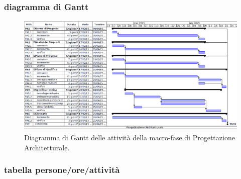 \newpage
\subsubsection{diagramma di Gantt}

\begin{figure}[h]
\begin{center}
\includegraphics[width=\textwidth, height=\textheight, keepaspectratio]{img/progarc-gantt.png}
\caption{Diagramma di Gantt delle attività della macro-fase di Progettazione Architetturale.}
\end{center}
\end{figure}
\clearpage

\newpage
\subsubsection{tabella persone/ore/attività}

